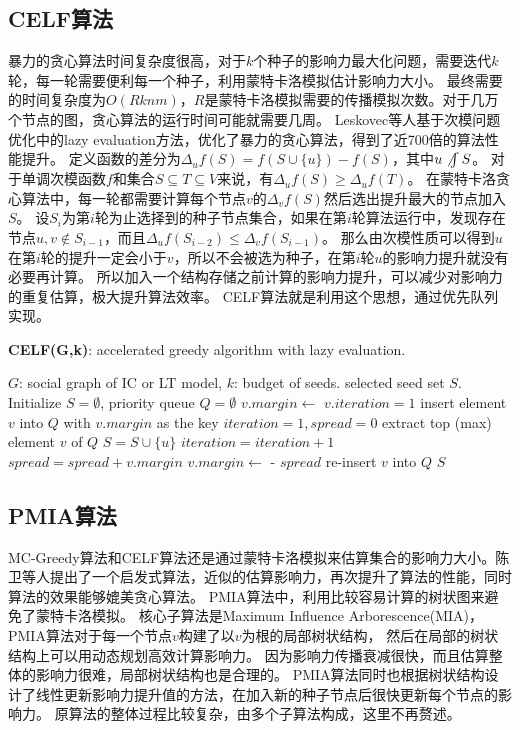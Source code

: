 \subsection{CELF算法}
暴力的贪心算法时间复杂度很高，对于$k$个种子的影响力最大化问题，需要迭代$k$轮，每一轮需要便利每一个种子，利用蒙特卡洛模拟估计影响力大小。
最终需要的时间复杂度为$O(Rknm)$，$R$是蒙特卡洛模拟需要的传播模拟次数。对于几万个节点的图，贪心算法的运行时间可能就需要几周。
Leskovec等人\cite{Leskovec2007celf}基于次模问题优化中的lazy evaluation方法，优化了暴力的贪心算法，得到了近700倍的算法性能提升。
定义函数的差分为$\Delta_u f(S) = f(S \cup \{u\}) - f(S)$，其中$u \not\int S$。
对于单调次模函数$f$和集合$S \subseteq T \subseteq V$来说，有$\Delta_u f(S) \geq \Delta_u f(T)$。
在蒙特卡洛贪心算法中，每一轮都需要计算每个节点$v$的$\Delta_v f(S)$然后选出提升最大的节点加入$S$。
设$S_i$为第$i$轮为止选择到的种子节点集合，如果在第$i$轮算法运行中，发现存在节点$u,v \not\in S_{i-1}$，而且$\Delta_u f(S_{i-2}) \leq \Delta_v f(S_{i-1})$。
那么由次模性质可以得到$u$在第$i$轮的提升一定会小于$v$，所以不会被选为种子，在第$i$轮$u$的影响力提升就没有必要再计算。
所以加入一个结构存储之前计算的影响力提升，可以减少对影响力的重复估算，极大提升算法效率。
CELF算法就是利用这个思想，通过优先队列实现。

\begin{algorithm}
	\caption{\textbf{CELF(G,k)}: accelerated greedy algorithm with lazy evaluation.}
	\label{alg:celf} 
	\begin{algorithmic}[1]
		\Require $G$: social graph of IC or LT model, $k$: budget of seeds.
		\Ensure selected seed set $S$.
		\State Initialize $S = \emptyset$, priority queue $Q = \emptyset$
			\State $v.margin \gets$ 
			\State $v.iteration = 1$
			\State insert element $v$ into $Q$ with $v.margin$ as the key
		\EndFor
		\State $iteration = 1, spread = 0$
			\State extract top (max) element $v$ of $Q$
				\State $S = S \cup \{u\}$
				\State $iteration = iteration+1$
				\State $spread = spread + v.margin$
			\Else
				\State $v.margin \gets$  - $spread$
				\State re-insert $v$ into $Q$
			\EndIf
		\EndWhile
		\State \Return $S$
	\end{algorithmic} 
\end{algorithm}

\subsection{PMIA算法}
MC-Greedy算法和CELF算法还是通过蒙特卡洛模拟来估算集合的影响力大小。陈卫等人提出了一个启发式算法，近似的估算影响力，再次提升了算法的性能，同时算法的效果能够媲美贪心算法。
PMIA算法\cite{chen2010sharpphard}中，利用比较容易计算的树状图来避免了蒙特卡洛模拟。
核心子算法是Maximum Influence Arborescence(MIA)，PMIA算法对于每一个节点$v$构建了以$v$为根的局部树状结构，
然后在局部的树状结构上可以用动态规划高效计算影响力。
因为影响力传播衰减很快，而且估算整体的影响力很难，局部树状结构也是合理的。
PMIA算法同时也根据树状结构设计了线性更新影响力提升值的方法，在加入新的种子节点后很快更新每个节点的影响力。
原算法的整体过程比较复杂，由多个子算法构成，这里不再赘述。

